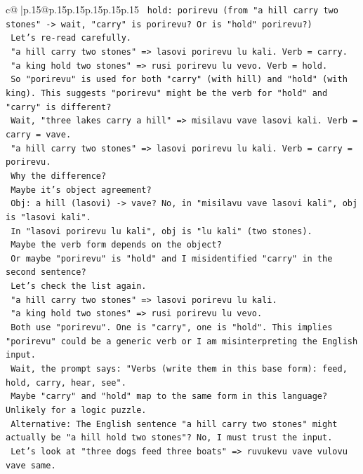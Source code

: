 \documentclass{article}
\begin{document}
{\begin{supertabular}{c@{$\;$}|p{.15\linewidth}@{}p{.15\linewidth}p{.15\linewidth}p{.15\linewidth}p{.15\linewidth}p{.15\linewidth}}
{{{\texttt{   hold: porirevu (from "a hill carry two stones" {-}> wait, "carry" is porirevu? Or is "hold" porirevu?)} \\
\texttt{   Let's re{-}read carefully.} \\
\texttt{   "a hill carry two stones" => lasovi porirevu lu kali. Verb = carry.} \\
\texttt{   "a king hold two stones" => rusi porirevu lu vevo. Verb = hold.} \\
\texttt{   So "porirevu" is used for both "carry" (with hill) and "hold" (with king). This suggests "porirevu" might be the verb for "hold" and "carry" is different?} \\
\texttt{   Wait, "three lakes carry a hill" => misilavu vave lasovi kali. Verb = carry = vave.} \\
\texttt{   "a hill carry two stones" => lasovi porirevu lu kali. Verb = carry = porirevu.} \\
\texttt{   Why the difference?} \\
\texttt{   Maybe it's object agreement?} \\
\texttt{   Obj: a hill (lasovi) {-}> vave? No, in "misilavu vave lasovi kali", obj is "lasovi kali".} \\
\texttt{   In "lasovi porirevu lu kali", obj is "lu kali" (two stones).} \\
\texttt{   Maybe the verb form depends on the object?} \\
\texttt{   Or maybe "porirevu" is "hold" and I misidentified "carry" in the second sentence?} \\
\texttt{   Let's check the list again.} \\
\texttt{   "a hill carry two stones" => lasovi porirevu lu kali.} \\
\texttt{   "a king hold two stones" => rusi porirevu lu vevo.} \\
\texttt{   Both use "porirevu". One is "carry", one is "hold". This implies "porirevu" could be a generic verb or I am misinterpreting the English input.} \\
\texttt{   Wait, the prompt says: "Verbs (write them in this base form): feed, hold, carry, hear, see".} \\
\texttt{   Maybe "carry" and "hold" map to the same form in this language? Unlikely for a logic puzzle.} \\
\texttt{   Alternative: The English sentence "a hill carry two stones" might actually be "a hill hold two stones"? No, I must trust the input.} \\
\texttt{   Let's look at "three dogs feed three boats" => ruvukevu vave vulovu vave same.} \\
}}}
\end{supertabular}}
\end{document}
